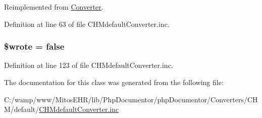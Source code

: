 \-Reimplemented from \hyperlink{class_converter_ab5dae87e1968b35e37687a763216a835}{\-Converter}.



\-Definition at line 63 of file \-C\-H\-Mdefault\-Converter.\-inc.

\hypertarget{class_c_h_mdefault_converter_a2cf37faa5637b7639b816f3e61485a30}{
\subsubsection[{\$wrote}]{\setlength{\rightskip}{0pt plus 5cm}\$wrote = false}}\label{class_c_h_mdefault_converter_a2cf37faa5637b7639b816f3e61485a30}


\-Definition at line 123 of file \-C\-H\-Mdefault\-Converter.\-inc.



\-The documentation for this class was generated from the following file\-:\begin{DoxyCompactItemize}
\item 
\-C\-:/wamp/www/\-Mitos\-E\-H\-R/lib/\-Php\-Documentor/php\-Documentor/\-Converters/\-C\-H\-M/default/\hyperlink{_c_h_mdefault_converter_8inc}{\-C\-H\-Mdefault\-Converter.\-inc}\end{DoxyCompactItemize}
